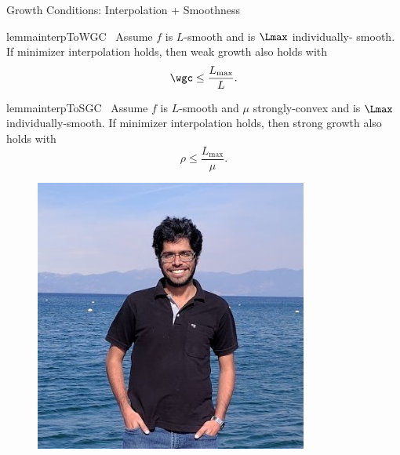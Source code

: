 \documentclass[mathserif,notheorems, hyperref={colorlinks, citecolor=blue, urlcolor=blue, linkcolor=blue}]{beamer}
\begin{document}
    \begin{frame}{Growth Conditions: Interpolation + Smoothness}
    \begin{center}
            
        \vspace{-2ex}
        \begin{minipage}[t]{0.82\textwidth}
            \vspace{-1.45ex}
            \begin{restatable}{lemma}{interpToWGC}~\label{lemma:interpolation-to-wgc}
                Assume \( f \) is \( L \)-smooth and \oracle{} is \( \Lmax \) individually- smooth. 
                If minimizer interpolation holds, then weak growth also holds with
                \[ \wgc \leq \frac{L_{\text{max}}}{L}. \]
            \end{restatable}
           

            \begin{restatable}{lemma}{interpToSGC}~\label{lemma:interpolation-to-sgc}
                Assume \( f \) is \( L \)-smooth and \( \mu \) strongly-convex and \oracle{} is \( \Lmax \) individually-smooth. 
                If minimizer interpolation holds, then strong growth also holds with 
                \[ \rho \leq \frac{L_{\text{max}}}{\mu}. \]
            \end{restatable}
        \end{minipage}
        \begin{minipage}[t]{0.15\textwidth}
            \begin{figure}[t]
                \centering
                \includegraphics[width=0.8\textwidth]{collaborators/sharan}


\end{figure}
\end{minipage}
\end{center}
\end{frame}
\end{document}
